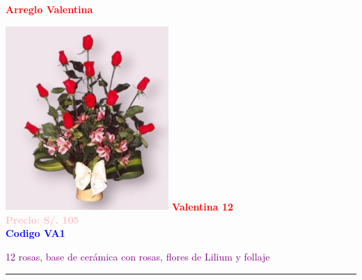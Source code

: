     \begin{center}
        \textbf{\Huge\textcolor{red}{Arreglo Valentina}}
    \end{center}
    \begin{multicols}{2}

    \begin{minipage}{\linewidth}
        \centering
        \includegraphics[height=7cm]{imagenes_extraidas/image_10_3} %
        \newline
        \vspace{0.1cm}
        \textbf{\Large \textcolor{red}{Valentina 12}} \\ %
        \vspace{0.2cm}
        \textbf{\textcolor{pink}{Precio: S/. 105}} \\ %
        \vspace{0.2cm}
        \textbf{\textcolor{blue}{Codigo VA1}} \\ %
        \vspace{0.2cm}
        \begin{minipage}{0.8\linewidth} 
            \small \textcolor{purple}{12 rosas, base de cerámica con rosas, flores de Lilium y follaje} %
        \end{minipage}
        \vspace{0.1cm}        
        \rule{\linewidth}{0.5pt}
    \end{minipage}
    

\end{multicols}
